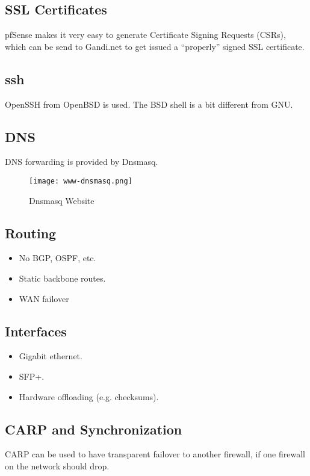 \subsection{SSL Certificates}
pfSense makes it very easy to generate Certificate Signing Requests (CSRs),
which can be send to Gandi.net to get issued a ``properly'' signed SSL
certificate.


\subsection{ssh}
OpenSSH from OpenBSD is used. The BSD shell is a bit different from GNU.


\subsection{DNS}
DNS forwarding is provided by Dnsmasq.

\begin{figure}[h!]
\texttt{[image: www-dnsmasq.png]}
 \caption{Dnsmasq Website}
 \label{fig:www-dnsmasq}
\end{figure}



\subsection{Routing}
\begin{itemize}
 \item No BGP, OSPF, etc.
 \item Static backbone routes.
 \item WAN failover
\end{itemize}


\subsection{Interfaces}

\begin{itemize}
 \item Gigabit ethernet.
 \item SFP+.
 \item Hardware offloading (e.g. checksums).
\end{itemize}


\subsection{CARP and Synchronization}
CARP can be used to have transparent failover to another firewall, if one
firewall on the network should drop.

